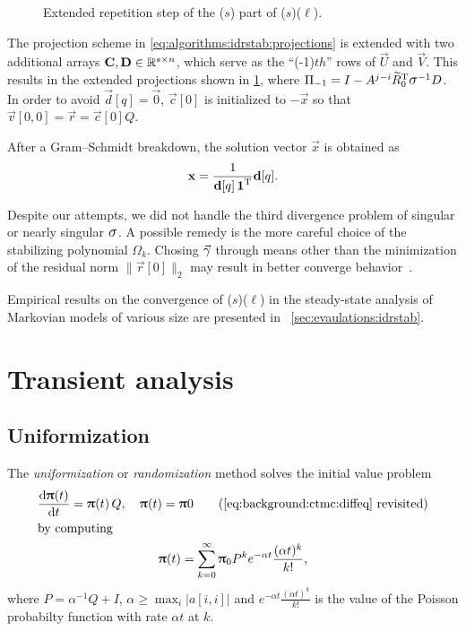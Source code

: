 \begin{figure}
  \centering\usebox\IdrStabProjectionsBox
  \caption{Extended repetition step of the ($s$) part of ($s$)($\ell$).}
  \label{fig:algorithms:idrstab:extended-projections}
\end{figure}

The projection scheme in \vref{eq:algorithms:idrstab:projections} is
extended with two additional arrays
$\bm{\mathrm{C}}, \bm{\mathrm{D}} \in \mathbb{R}^{s \times n}$, which serve as the
``(-1)$th$'' rows of $\vec{U}$ and $\vec{V}$. This results in the
extended projections shown in
\cref{fig:algorithms:idrstab:extended-projections}, where
$\Pi_{-1} = I - A^{j - i} \widetilde{R}_0^\T \largesigma^{-1} D$.  In
order to avoid $\vec{d}[q] = \vec{0}$, $\vec{c}[0]$ is initialized to
$-\vec{x}$ so that $\vec{v}[0, 0] = \vec{r} = \vec{c}[0] Q$.

After a Gram--Schmidt breakdown, the solution vector $\vec{x}$ is
obtained as
\begin{equation}
  \bm{\mathrm{x}} = \frac{1}{\bm{\mathrm{d}}[q] \, \bm{\mathrm{1}}^{\mathrm{T}}} \bm{\mathrm{d}}[q] \text.
\end{equation}

Despite our attempts, we did not handle the third divergence problem
of singular or nearly singular $\largesigma$. A possible remedy is the
more careful choice of the stabilizing polynomial $\Omega_k$. Chosing
$\vecarrow{\gamma}$ through means other than the minimization of the
residual norm $\| \vec{r}[0] \|_2$ may result in better converge
behavior~\citep{rendel2011tuning,sleijpen1995maintaining}.

Empirical results on the convergence of
($s$)($\ell$) in the steady-state analysis of
Markovian models of various size are presented in%
~\vref{sec:evaulations:idrstab}.

\section{Transient analysis}

\subsection{Uniformization}
\label{ssec:algorithms:uniformization}

The \emph{uniformization} or \emph{randomization} method solves the
initial value problem
\begin{gather}
  \frac{\dd \vec{\uppi}(t)}{\dd t} = \vec{\uppi}(t) \, Q, \quad
  \vec{\uppi}(t) = \vec{\uppi}{0}
  \tag{\ref{eq:background:ctmc:diffeq}~revisited}\\
  \shortintertext{by computing}
  \vec{\uppi}(t) = \sum_{k = 0}^{\infty} \vec{\uppi}_0 P^k e^{-\alpha
    t} \frac{(\alpha t)^k}{k!}\text,
  \label{eq:algorithms:transient:uniformization}
\end{gather}
where $P = \alpha^{-1} Q + I$,
$\alpha \ge \max_{i} \lvert a[i, i] \rvert$ and
$e^{-\alpha t} \frac{(\alpha t)^k}{k!}$ is the value of the Poisson
probabilty function with rate $\alpha t$ at $k$.

